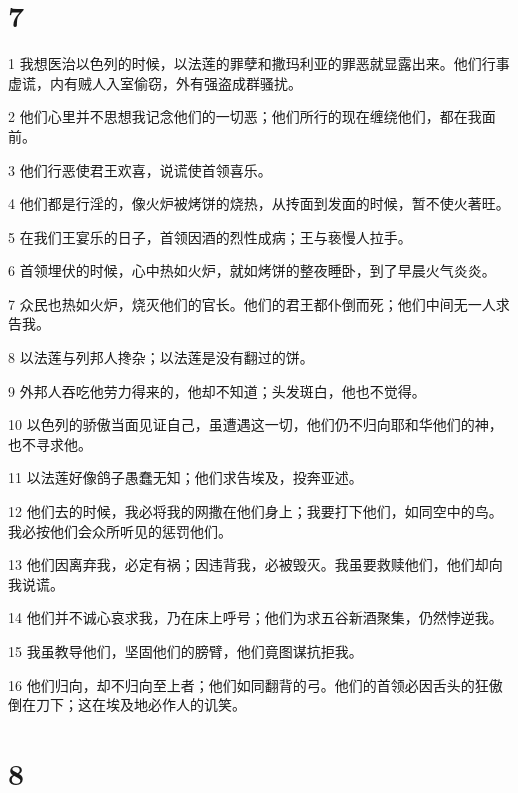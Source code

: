 \chapter{7}

\par 1 我想医治以色列的时候，以法莲的罪孽和撒玛利亚的罪恶就显露出来。他们行事虚谎，内有贼人入室偷窃，外有强盗成群骚扰。
\par 2 他们心里并不思想我记念他们的一切恶；他们所行的现在缠绕他们，都在我面前。
\par 3 他们行恶使君王欢喜，说谎使首领喜乐。
\par 4 他们都是行淫的，像火炉被烤饼的烧热，从抟面到发面的时候，暂不使火著旺。
\par 5 在我们王宴乐的日子，首领因酒的烈性成病；王与亵慢人拉手。
\par 6 首领埋伏的时候，心中热如火炉，就如烤饼的整夜睡卧，到了早晨火气炎炎。
\par 7 众民也热如火炉，烧灭他们的官长。他们的君王都仆倒而死；他们中间无一人求告我。
\par 8 以法莲与列邦人搀杂；以法莲是没有翻过的饼。
\par 9 外邦人吞吃他劳力得来的，他却不知道；头发斑白，他也不觉得。
\par 10 以色列的骄傲当面见证自己，虽遭遇这一切，他们仍不归向耶和华他们的神，也不寻求他。
\par 11 以法莲好像鸽子愚蠢无知；他们求告埃及，投奔亚述。
\par 12 他们去的时候，我必将我的网撒在他们身上；我要打下他们，如同空中的鸟。我必按他们会众所听见的惩罚他们。
\par 13 他们因离弃我，必定有祸；因违背我，必被毁灭。我虽要救赎他们，他们却向我说谎。
\par 14 他们并不诚心哀求我，乃在床上呼号；他们为求五谷新酒聚集，仍然悖逆我。
\par 15 我虽教导他们，坚固他们的膀臂，他们竟图谋抗拒我。
\par 16 他们归向，却不归向至上者；他们如同翻背的弓。他们的首领必因舌头的狂傲倒在刀下；这在埃及地必作人的讥笑。

\chapter{8}

